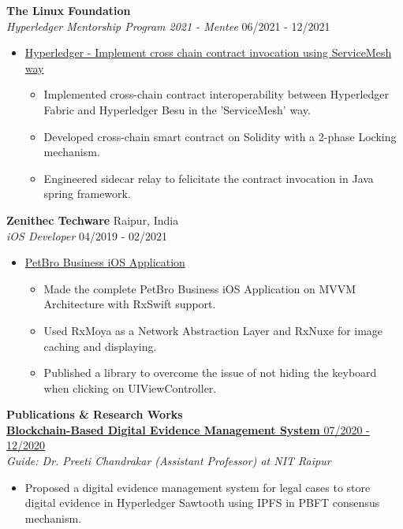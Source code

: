 \documentclass{article}
\begin{document}
\noindent \normalsize \textbf{The Linux Foundation} \\
\textit{Hyperledger Mentorship Program 2021 - Mentee} \hfill 06/2021 - 12/2021
\begin{itemize}[noitemsep,nolistsep,leftmargin=*]
    \item {\normalsize \href{https://wiki.hyperledger.org/display/INTERN/Implement+cross+chain+contract+invocation+using+ServiceMesh+way}{Hyperledger - Implement cross chain contract invocation using ServiceMesh way}
        \begin{itemize}
            \item Implemented cross-chain contract interoperability between Hyperledger Fabric and Hyperledger Besu in the 'ServiceMesh' way.
            \item Developed cross-chain smart contract on Solidity with a 2-phase Locking mechanism.
            \item Engineered sidecar relay to felicitate the contract invocation in Java spring framework.
        \end{itemize}
    }
\end{itemize}

\noindent \normalsize \textbf{Zenithec Techware} \hfill Raipur, India  \\
\textit{iOS Developer} \hfill 04/2019 - 02/2021
\begin{itemize}[noitemsep,nolistsep,leftmargin=*]
    \item {\normalsize \href{https://apple.co/3kAiLJ0}{PetBro Business iOS Application}
        \begin{itemize}
            \item Made the complete PetBro Business iOS Application on MVVM Architecture with RxSwift support.
            \item Used RxMoya as a Network Abstraction Layer and RxNuxe for image caching and displaying.
            \item Published a library to overcome the issue of not hiding the keyboard when clicking on UIViewController.
        \end{itemize}
    }
\end{itemize}

\noindent \large \textbf{\textcolor{NavyBlue}{Publications \& Research Works}} \vspace{3pt} \\
\noindent \normalsize \href{https://link.springer.com/content/pdf/10.1007/978-3-030-82469-3_30}{\textbf{Blockchain-Based Digital Evidence Management System } \hfill 07/2020 - 12/2020} \\
\textit{Guide: Dr. Preeti Chandrakar (Assistant Professor) at NIT Raipur} \hfill
\begin{itemize}
    \item Proposed a digital evidence management system for legal cases to store digital evidence in Hyperledger Sawtooth using IPFS in PBFT consensus mechanism.
\end{itemize}
\end{document}
